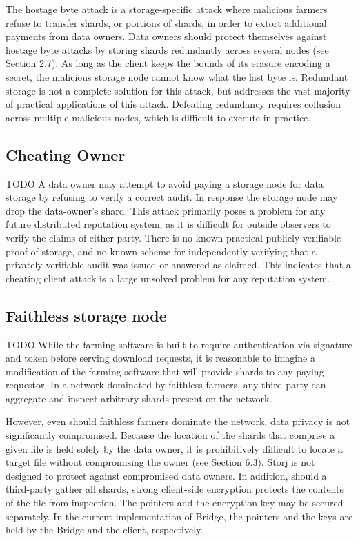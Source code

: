 \documentclass[a4paper,10pt]{article} \usepackage[utf8]{inputenc}
\newcommand{\todo}[1]{{\color{red} TODO #1 }}
\begin{document}
The hostage byte attack is a storage-specific attack where malicious farmers
refuse to transfer shards, or portions of shards, in order to extort additional
payments from data owners. Data owners should protect themselves against hostage
byte attacks by storing shards redundantly across several nodes (see Section
2.7). As long as the client keeps the bounds of its erasure encoding a secret,
the malicious storage node cannot know what the last byte is. Redundant storage 
is not
a complete solution for this attack, but addresses the vast majority of
practical applications of this attack. Defeating redundancy requires collusion
across multiple malicious nodes, which is difficult to execute in practice.

\subsection{Cheating Owner}

\todo{ A data owner may attempt to avoid paying a storage node for data storage 
by
refusing to verify a correct audit. In response the storage node may drop the
data-owner's shard. This attack primarily poses a problem for any future
distributed reputation system, as it is difficult for outside observers to
verify the claims of either party. There is no known practical publicly
verifiable proof of storage, and no known scheme for independently verifying
that a privately verifiable audit was issued or answered as claimed. This
indicates that a cheating client attack is a large unsolved problem for any
reputation system. }

\subsection{Faithless storage node}

\todo{ While the farming software is built to require authentication via
signature and token before serving download requests, it is reasonable to
imagine a modification of the farming software that will provide shards to any
paying requestor. In a network dominated by faithless farmers, any third-party
can aggregate and inspect arbitrary shards present on the network.

However, even should faithless farmers dominate the network, data privacy is not
significantly compromised. Because the location of the shards that comprise a
given file is held solely by the data owner, it is prohibitively difficult to
locate a target file without compromising the owner (see Section 6.3). Storj is
not designed to protect against compromised data owners. In addition, should a
third-party gather all shards, strong client-side encryption protects the
contents of the file from inspection. The pointers and the encryption key may be
secured separately. In the current implementation of Bridge, the pointers and
the keys are held by the Bridge and the client, respectively. }
\end{document}

